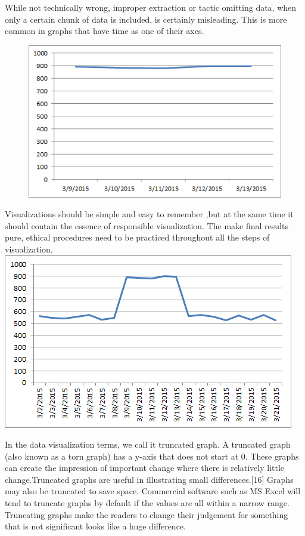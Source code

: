 \documentclass[]{book}
\theoremstyle{definition}
\theoremstyle{definition}
\theoremstyle{definition}
\theoremstyle{remark}
\begin{document}
While not technically wrong, improper extraction or tactic omitting
data, when only a certain chunk of data is included, is certainly
misleading. This is more common in graphs that have time as one of their
axes.

\begin{figure}
\centering
\includegraphics{images/Bad_graph_extraction.png}
\caption{}
\end{figure}

Visualizations should be simple and easy to remember ,but at the same
time it should contain the essence of responsible visualization. The
make final results pure, ethical procedures need to be practiced
throughout all the steps of visualization.
\includegraphics{images/Good_graph_extraction.png}

In the data visualization terms, we call it truncated graph. A truncated
graph (also known as a torn graph) has a y-axis that does not start at
0. These graphs can create the impression of important change where
there is relatively little change.Truncated graphs are useful in
illustrating small differences.{[}16{]} Graphs may also be truncated to
save space. Commercial software such as MS Excel will tend to truncate
graphs by default if the values are all within a narrow range.
Truncating graphs make the readers to change their judgement for
something that is not significant looks like a huge difference.
\end{document}
